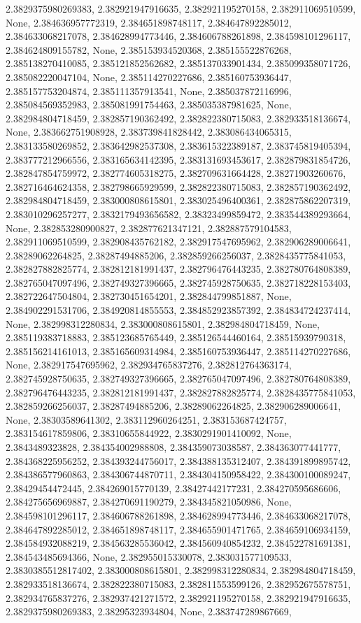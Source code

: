 \documentclass[
  11pt,
  french,
]{article}
\begin{document}
\begin{tcolorbox}[title= Répartition des volumes selon leurs caractéristiques ,colback=boitecode]
2.3829375980269383, 2.382921947916635, 2.382921195270158, 2.382911069510599, None, 2.384636957772319, 2.384651898748117, 2.384647892285012, 2.384633068217078, 2.384628994773446, 2.384606788261898, 2.384598101296117, 2.384624809155782, None, 2.385153934520368, 2.385155522876268, 2.385138270410085, 2.385121852562682, 2.385137033901434, 2.385099358071726, 2.385082220047104, None, 2.385114270227686, 2.385160753936447, 2.385157753204874, 2.385111357913541, None, 2.385037872116996, 2.385084569352983, 2.385081991754463, 2.385035387981625, None, 2.382984804718459, 2.382857190362492, 2.382822380715083, 2.382933518136674, None, 2.383662751908928, 2.383739841828442, 2.383086434065315, 2.383133580269852, 2.383642982537308, 2.383615322389187, 2.383745819405394, 2.383777212966556, 2.383165634142395, 2.383131693453617, 2.382879831854726, 2.382847854759972, 2.382774605318275, 2.382709631664428, 2.38271903260676, 2.382716464624358, 2.382798665929599, 2.382822380715083, 2.382857190362492, 2.382984804718459, 2.383000808615801, 2.383025496400361, 2.382875862207319, 2.383010296257277, 2.3832179493656582, 2.38323499859472, 2.383544389293664, None, 2.382853280900827, 2.382877621347121, 2.382887579104583, 2.382911069510599, 2.382908435762182, 2.382917547695962, 2.382906289006641, 2.38289062264825, 2.38287494885206, 2.382859266256037, 2.3828435775841053, 2.382827882825774, 2.382812181991437, 2.382796476443235, 2.382780764808389, 2.382765047097496, 2.382749327396665, 2.382745928750635, 2.382718228153403, 2.382722647504804, 2.382730451654201, 2.382844799851887, None, 2.384902291531706, 2.384920814855553, 2.384852923857392, 2.384834724237414, None, 2.382998312280834, 2.383000808615801, 2.382984804718459, None, 2.385119383718883, 2.385123685765449, 2.385126544460164, 2.38515939790318, 2.385156214161013, 2.385165609314984, 2.385160753936447, 2.385114270227686, None, 2.382917547695962, 2.382934765837276, 2.382812764363174, 2.382745928750635, 2.382749327396665, 2.382765047097496, 2.382780764808389, 2.382796476443235, 2.382812181991437, 2.382827882825774, 2.3828435775841053, 2.382859266256037, 2.38287494885206, 2.38289062264825, 2.382906289006641, None, 2.38303589641302, 2.383112960264251, 2.383153687424757, 2.383154617859806, 2.38310655844922, 2.3830291901410092, None, 2.3843489323828, 2.384354002988808, 2.384359073038587, 2.384363077441777, 2.384368225956252, 2.384393244756017, 2.384388135312407, 2.384391899895742, 2.384386577960863, 2.384306744870711, 2.384304150958422, 2.384300100089247, 2.38429454472445, 2.384269015770139, 2.38427442177231, 2.384270595686606, 2.384275656969887, 2.384270691190279, 2.384345821050986, None, 2.384598101296117, 2.384606788261898, 2.384628994773446, 2.384633068217078, 2.384647892285012, 2.384651898748117, 2.384655901471765, 2.384659106934159, 2.384584932088219, 2.384563285536042, 2.384560940854232, 2.384522781691381, 2.384543485694366, None, 2.382955015330078, 2.383031577109533, 2.3830385512817402, 2.383000808615801, 2.382998312280834, 2.382984804718459, 2.382933518136674, 2.382822380715083, 2.382811553599126, 2.382952675578751, 2.382934765837276, 2.382937421271572, 2.382921195270158, 2.382921947916635, 2.3829375980269383, 2.38295323934804, None, 2.383747289867669, 
\end{tcolorbox}
\end{document}
